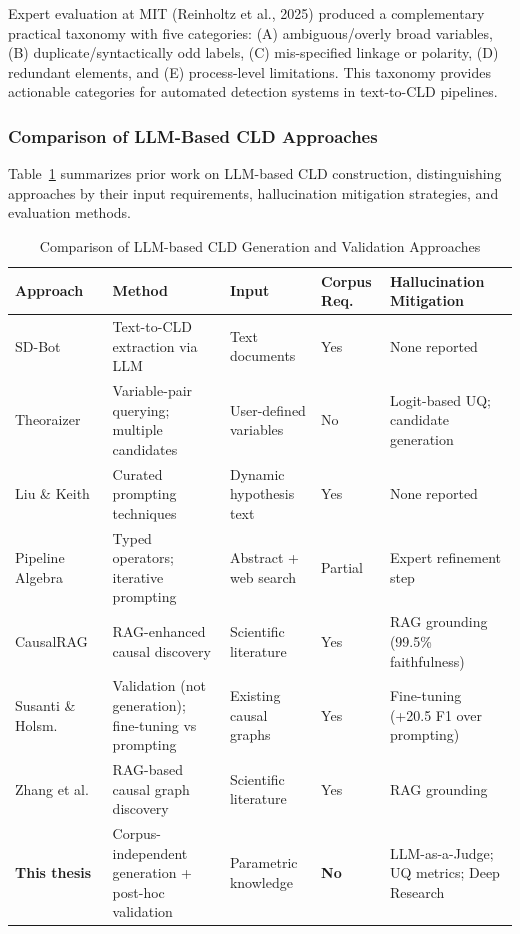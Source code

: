 Expert evaluation at MIT (Reinholtz et al., 2025) produced a complementary practical taxonomy with five categories: (A) ambiguous/overly broad variables, (B) duplicate/syntactically odd labels, (C) mis-specified linkage or polarity, (D) redundant elements, and (E) process-level limitations. This taxonomy provides actionable categories for automated detection systems in text-to-CLD pipelines.

\subsubsection{Comparison of LLM-Based CLD Approaches}

Table~\ref{tab:prior_cld_work} summarizes prior work on LLM-based CLD construction, distinguishing approaches by their input requirements, hallucination mitigation strategies, and evaluation methods.

\begin{table}[H]
\centering
\caption{Comparison of LLM-based CLD Generation and Validation Approaches}
\label{tab:prior_cld_work}
\footnotesize
\begin{tabular}{p{2.0cm}p{2.4cm}p{1.8cm}p{1.5cm}p{3.0cm}}
\toprule
\textbf{Approach} & \textbf{Method} & \textbf{Input} & \textbf{Corpus Req.} & \textbf{Hallucination Mitigation} \\
\midrule
SD-Bot~\citep{hosseinichimeh2024textmapdynamicsbot} & Text-to-CLD extraction via LLM & Text documents & Yes & None reported \\
\midrule
Theoraizer~\citep{Waaijers2024theoraizer} & Variable-pair querying; multiple candidates & User-defined variables & No & Logit-based UQ; candidate generation \\
\midrule
Liu \& Keith~\citep{liu2025leveraging} & Curated prompting techniques & Dynamic hypothesis text & Yes & None reported \\
\midrule
Pipeline Algebra~\citep{reinholtz2025pipelinealgebra} & Typed operators; iterative prompting & Abstract + web search & Partial & Expert refinement step \\
\midrule
CausalRAG~\citep{wang2025causalrag} & RAG-enhanced causal discovery & Scientific literature & Yes & RAG grounding (99.5\% faithfulness) \\
\midrule
Susanti \& Holsm.~\citep{susanti2025prompting} & Validation (not generation); fine-tuning vs prompting & Existing causal graphs & Yes & Fine-tuning (+20.5 F1 over prompting) \\
\midrule
Zhang et al.~\citep{zhang2024causal} & RAG-based causal graph discovery & Scientific literature & Yes & RAG grounding \\
\midrule
\textbf{This thesis} & Corpus-independent generation + post-hoc validation & Parametric knowledge & \textbf{No} & LLM-as-a-Judge; UQ metrics; Deep Research \\
\bottomrule
\end{tabular}
\end{table}

